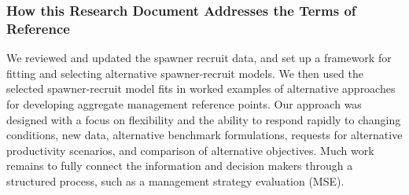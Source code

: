 \documentclass[french,11pt]{book}
\begin{document}
\subsubsection{How this Research Document Addresses the Terms of Reference}\label{TORLink}

We reviewed and updated the spawner recruit data, and set up a framework for fitting and selecting alternative spawner-recruit models. We then used the selected spawner-recruit model fits in worked examples of alternative approaches for developing aggregate management reference points. Our approach was designed with a focus on flexibility and the ability to respond rapidly to changing conditions, new data, alternative benchmark formulations, requests for alternative productivity scenarios, and comparison of alternative objectives. Much work remains to fully connect the information and decision makers through a structured process, such as a management strategy evaluation (MSE).
\end{document}
